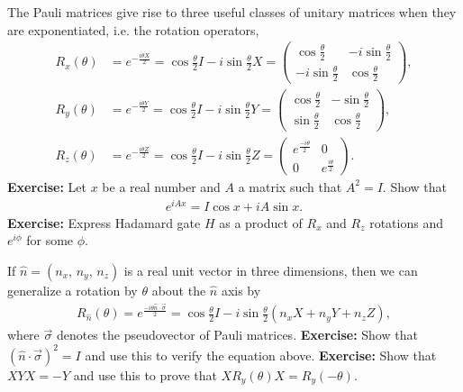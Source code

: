 \documentclass{beamer}
\begin{document}
\begin{frame}
\justify
The Pauli matrices give rise to three useful classes of unitary matrices when they are exponentiated, i.e. the rotation operators,
\begin{align}
R_x(\theta) & = e^{-\frac{i\theta X}{2}} = \cos \frac{\theta}{2}I - i \sin \frac{\theta}{2} X = \begin{pmatrix} \cos \frac{\theta}{2} & -i \sin \frac{\theta}{2} \\ -i \sin \frac{\theta}{2} & \cos \frac{\theta}{2} \end{pmatrix}, \\
R_y(\theta) & = e^{-\frac{i\theta Y}{2}} = \cos \frac{\theta}{2}I - i \sin \frac{\theta}{2} Y = \begin{pmatrix} \cos \frac{\theta}{2} & - \sin \frac{\theta}{2} \\ \sin \frac{\theta}{2} & \cos \frac{\theta}{2} \end{pmatrix}, \\
R_z(\theta) & = e^{-\frac{i\theta Z}{2}} = \cos \frac{\theta}{2}I - i \sin \frac{\theta}{2} Z = \begin{pmatrix} e^{\frac{-i \theta}{2}} & 0 \\ 0 & e^{\frac{i \theta}{2}} \end{pmatrix}.
\end{align}
\vfill
\textbf{Exercise:} Let $x$ be a real number and $A$ a matrix such that $A^2 = I$. Show that
\begin{align}
e^{iAx} = I \cos x + i A \sin x.
\end{align}
\vfill
\textbf{Exercise:} Express Hadamard gate $H$ as a product of $R_x$ and $R_z$ rotations and $e^{i\phi}$ for some $\phi$.
\end{frame}

\begin{frame}
\justify
If $\hat{n} = (n_x,\,n_y,\,n_z)$ is a real unit vector in three dimensions, then we can generalize a rotation by $\theta$ about the $\hat{n}$ axis by
\begin{align}
R_{\hat{n}}(\theta) = e^{\frac{-i\theta \hat{n} \cdot \vec{\sigma}}{2}} = \cos \frac{\theta}{2} I - i \sin \frac{\theta}{2} (n_x X + n_y Y + n_z Z),
\end{align}
where $\vec{\sigma}$ denotes the pseudovector of Pauli matrices.
\vfill
\textbf{Exercise:} Show that $(\hat{n}\cdot\vec{\sigma})^2 = I$ and use this to verify the equation above.
\vfill
\textbf{Exercise:} Show that $XYX = -Y$ and use this to prove that $X R_y(\theta) X = R_y(-\theta)$.
\end{frame}
\end{document}
